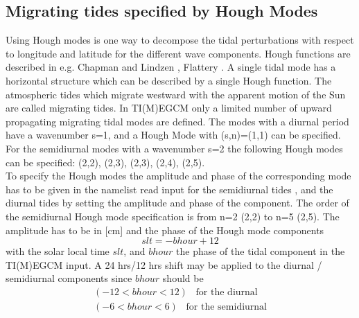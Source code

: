 \subsection{Migrating tides specified by Hough Modes}
%
Using Hough modes is one way to decompose the tidal perturbations with respect to longitude and
latitude for the different wave components. Hough functions are described in 
 e.g. Chapman and
Lindzen \cite{Chapman1970}, Flattery \cite{Flattery1967}. A single tidal mode has a horizontal structure which can be described
by a single Hough function. The atmospheric tides which migrate westward with the apparent
motion of the Sun are called migrating tides. In TI(M)EGCM only a limited number of upward propagating migrating
tidal modes are
defined. The modes with a diurnal period have a wavenumber s=1, and a Hough Mode with (s,n)=(1,1)
can be specified. For the semidiurnal modes with a wavenumber s=2 the following Hough modes can be
specified: (2,2), (2,3), (2,3), (2,4), (2,5). \\
%
To specify the Hough modes the amplitude and phase of the corresponding mode has to be given in
the namelist read input for the semidiurnal tides , and the diurnal tides   by
setting the amplitude and phase of the component. The order of the semidiurnal Hough mode
specification is from n=2 (2,2) to n=5 (2,5). The amplitude has to be in [cm] and the phase of the
Hough mode components 
%
\begin{equation}
   slt=-bhour+12
\end{equation}
%
with the solar local time $slt$, and $bhour$ the phase of the tidal component in the TI(M)EGCM input.
A 24 hrs/12 hrs shift may be applied to the diurnal / semidiurnal components since $bhour$ should 
be  
%
\begin{equation}
  \begin{split}
    (-12 < bhour < 12) \;\;\; \text{for the diurnal}\\
    (-6 < bhour < 6) \;\;\;  \text{for the semidiurnal}
  \end{split}
\end{equation}
%
